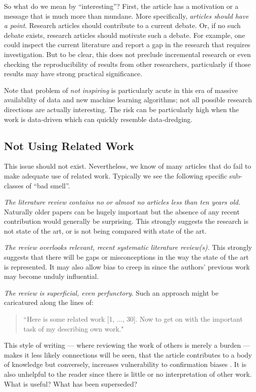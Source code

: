 \documentclass[preprint,10pt]{elsarticle}
\newcommand{\RED}{\color{red}}
\newcommand{\BLACK}{\color{black}}
\begin{document}
So what do we mean by ``interesting''?  First, the article has a motivation or a message that is much more than mundane.  More specifically, {\em articles should have a point}. Research articles should contribute to a current debate. Or, if no such debate exists, research articles should motivate such a debate.  For example, one could inspect the current literature and report a gap in the research that requires investigation.  But to be clear, this does not preclude incremental research or even checking the reproducibility of results from other researchers, particularly if those results may have strong practical significance.

Note that problem of {\em not inspiring} is particularly acute in this era of massive availability of data and new machine learning algorithms; not all possible research directions are actually interesting.  The risk can be particularly high when the work is data-driven which can quickly resemble data-dredging.


\subsection{Not Using Related Work}
This issue should not exist. Nevertheless, we know of many articles that do fail to make adequate use of related work. Typically we see the following specific sub-classes of ``bad smell''.

 {\em The literature review contains no or almost no articles less than ten years old.}  \RED Naturally older papers can be hugely important but the absence of any recent contribution would generally be surprising. \BLACK This strongly suggests the research is not state of the art, or is not being compared with state of the art.

{\em The review overlooks relevant, recent systematic literature review(s).}  This strongly suggests that there will be gaps or misconceptions in the way the state of the art is represented.  It may also allow bias to creep in since the authors' previous work may become unduly influential.

{\em The review is superficial, even perfunctory}. Such an approach might be caricatured along the lines of: \begin{quote}
    ``Here is some related work [1, ..., 30].  Now to get on with the important task of my describing own work."
\end{quote}
This style of writing --- where reviewing the work of others is merely a burden --- makes it less likely connections will be seen, that the article contributes to a body of knowledge but conversely, increases vulnerability to confirmation biases \cite{Nick98}.  It is also unhelpful to the reader since there is little or no interpretation of other work.  What is useful?  What has been superseded?
\end{document}
